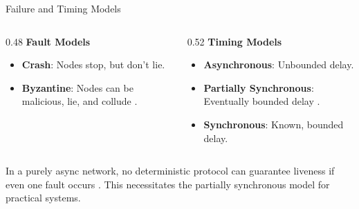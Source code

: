 \documentclass[aspectratio=169]{beamer}
\begin{document}
\begin{frame}{Failure and Timing Models}
    \begin{tcolorbox}[enhanced, colback=d2s.fg!30, colframe=black, fonttitle=\bfseries, title={Fault and Timing Models}]
        \begin{columns}[T]
            \begin{column}{0.48\linewidth}
                \textbf{Fault Models}
                \begin{itemize}
                    \item \textbf{Crash}: Nodes stop, but don't lie.
                    \item \textbf{Byzantine}: Nodes can be malicious, lie, and collude \cite{lamport_byzantine_1982}.
                \end{itemize}
            \end{column}
            \begin{column}{0.52\linewidth}
                \textbf{Timing Models}
                \begin{itemize}
                    \item \textbf{Asynchronous}: Unbounded delay.
                    \item \textbf{Partially Synchronous}: Eventually bounded delay \cite{10.1145/42282.42283}.
                    \item \textbf{Synchronous}: Known, bounded delay.
                \end{itemize}
            \end{column}
        \end{columns}
    \end{tcolorbox}
    \vfill
    \begin{tcolorbox}[enhanced, colback=red!20, colframe=red!75!black, fonttitle=\bfseries, title={Landmark: FLP Impossibility}, rounded corners, drop shadow, valign=center]
    \small In a purely async network, no deterministic protocol can guarantee liveness if even one fault occurs \cite{fischer_impossibility_1985}. This necessitates the partially synchronous model for practical systems.
    \end{tcolorbox}
\end{frame}
\end{document}
